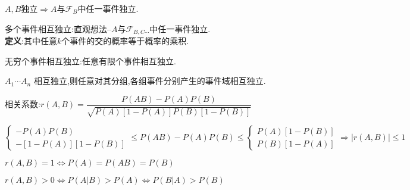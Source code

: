 $ A,B$独立$ \Rightarrow A与\mathcal{F}_B$中任一事件独立.

多个事件相互独立:直观想法--$ A与\mathcal{F}_{B,C\cdots}$中任一事件独立.
\\

{\bf 定义}:其中任意$ k$个事件的交的概率等于概率的乘积.

无穷个事件相互独立:任意有限个事件相互独立.

$ A_1\cdots A_n$ 相互独立,则任意对其分组,各组事件分别产生的事件域相互独立.

相关系数:$ r(A,B)=\dfrac{P(AB)- P(A)P(B)}{\sqrt{P(A)[1-P(A)]P(B)[1-P(B)]}}$

$ \left \{\begin{matrix}-P(A)P(B)\\  -[1-P(A)][1-P(B)]\end{matrix} \right . \le P(AB)-P(A)P(B) \le \left \{ \begin{matrix} P(A)[1-P(B)]\\ P(B)[1-P(A)]\end{matrix}\right . 
			\Rightarrow  |r(A,B)| \le 1$ 

$ r(A,B)=1\Leftrightarrow P(A)=P(AB)=P(B)$

$ r(A,B)>0\Leftrightarrow P(A|B)>P(A)\Leftrightarrow P(B|A)>P(B)$

